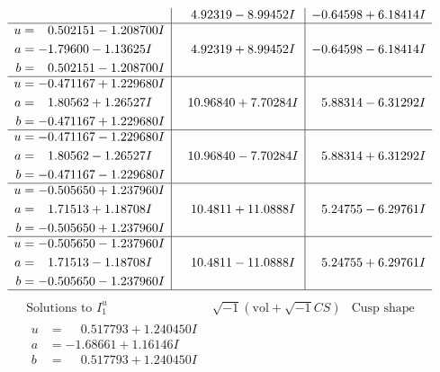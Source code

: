 \documentclass[1p]{elsarticle_modified}
\theoremstyle{definition}
\newcommand{\I}{\sqrt{-1}}
\begin{document}
$$\begin{array}{c|c|c}
 & \phantom{-}4.92319 - 8.99452 I & -0.64598 + 6.18414 I \\ \hline\begin{aligned}
u &= \phantom{-}0.502151 - 1.208700 I \\
a &= -1.79600 - 1.13625 I \\
b &= \phantom{-}0.502151 - 1.208700 I\end{aligned}
 & \phantom{-}4.92319 + 8.99452 I & -0.64598 - 6.18414 I \\ \hline\begin{aligned}
u &= -0.471167 + 1.229680 I \\
a &= \phantom{-}1.80562 + 1.26527 I \\
b &= -0.471167 + 1.229680 I\end{aligned}
 & \phantom{-}10.96840 + 7.70284 I & \phantom{-}5.88314 - 6.31292 I \\ \hline\begin{aligned}
u &= -0.471167 - 1.229680 I \\
a &= \phantom{-}1.80562 - 1.26527 I \\
b &= -0.471167 - 1.229680 I\end{aligned}
 & \phantom{-}10.96840 - 7.70284 I & \phantom{-}5.88314 + 6.31292 I \\ \hline\begin{aligned}
u &= -0.505650 + 1.237960 I \\
a &= \phantom{-}1.71513 + 1.18708 I \\
b &= -0.505650 + 1.237960 I\end{aligned}
 & \phantom{-}10.4811 + 11.0888 I & \phantom{-}5.24755 - 6.29761 I \\ \hline\begin{aligned}
u &= -0.505650 - 1.237960 I \\
a &= \phantom{-}1.71513 - 1.18708 I \\
b &= -0.505650 - 1.237960 I\end{aligned}
 & \phantom{-}10.4811 - 11.0888 I & \phantom{-}5.24755 + 6.29761 I\\
 \hline 
 \end{array}$$\newpage$$\begin{array}{c|c|c}  
\text{Solutions to }I^u_{1}& \I (\text{vol} + \sqrt{-1}CS) & \text{Cusp shape}\\
 \hline 
\begin{aligned}
u &= \phantom{-}0.517793 + 1.240450 I \\
a &= -1.68661 + 1.16146 I \\
b &= \phantom{-}0.517793 + 1.240450 I\end{aligned}

\end{array}$$
\end{document}
